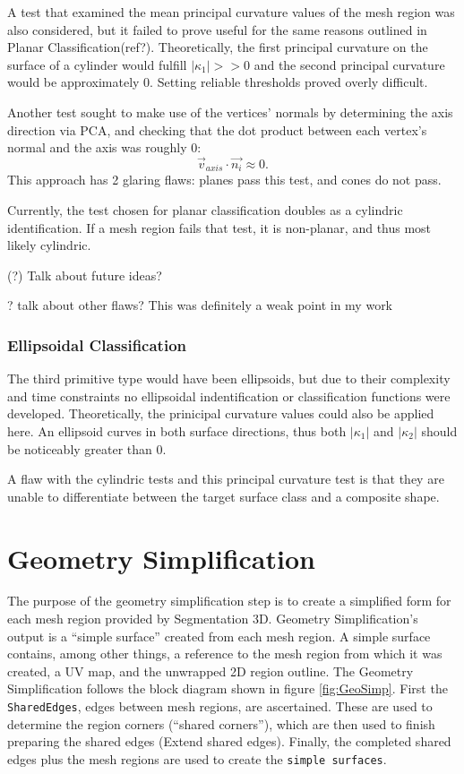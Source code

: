 A test that examined the mean principal curvature values of the mesh region was also considered, but it failed to prove useful for the same reasons outlined in Planar Classification(ref?).
Theoretically, the first principal curvature on the surface of a cylinder would fulfill $|\kappa_1| >> 0$ and the second principal curvature would be approximately 0.
Setting reliable thresholds proved overly difficult.

Another test sought to make use of the vertices' normals by determining the axis direction via PCA, and checking that the dot product between each vertex's normal and the axis was roughly 0:
\begin{equation}
	\vec{v}_{axis} \cdot \vec{n_i} \approx 0.
\end{equation}
This approach has 2 glaring flaws: planes pass this test, and cones do not pass.

Currently, the test chosen for planar classification doubles as a cylindric identification.
If a mesh region fails that test, it is non-planar, and thus most likely cylindric.

(?) Talk about future ideas?

? talk about other flaws? This was definitely a weak point in my work

\subsubsection{Ellipsoidal Classification}
The third primitive type would have been ellipsoids, but due to their complexity and time constraints no ellipsoidal indentification or classification functions were developed.
Theoretically, the prinicipal curvature values could also be applied here.
An ellipsoid curves in both surface directions, thus both $|\kappa_1|$ and $|\kappa_2|$ should be noticeably greater than 0.

A flaw with the cylindric tests and this principal curvature test is that they are unable to differentiate between the target surface class and a composite shape.

\section{Geometry Simplification}
The purpose of the geometry simplification step is to create a simplified form for each mesh region provided by Segmentation 3D.
Geometry Simplification's output is a ``simple surface'' created from each mesh region.
A simple surface contains, among other things, a reference to the mesh region from which it was created, a UV map, and the unwrapped 2D region outline.
The Geometry Simplification follows the block diagram shown in figure \ref{fig:GeoSimp}.
First the \verb|SharedEdges|, edges between mesh regions, are ascertained.
These are used to determine the region corners (``shared corners''), which are then used to finish preparing the shared edges (Extend shared edges).
Finally, the completed shared edges plus the mesh regions are used to create the \verb|simple surfaces|.

